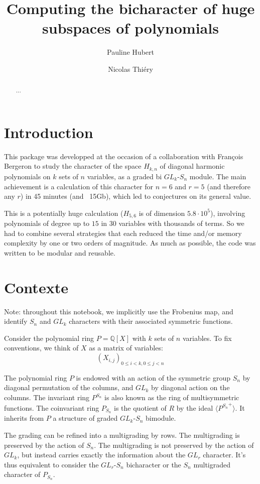 \documentclass[letter,12pt]{article}
\title{Computing the bicharacter of huge subspaces of polynomials}
\author{Pauline Hubert \and Nicolas Thiéry}
\newcommand{\QQ}{\mathbb{Q}}
\begin{document}
	
	\maketitle 
	
	\begin{abstract}
		... 
	\end{abstract}
	
	\tableofcontents

	
	\section{Introduction}
	This package was developped at the occasion of a collaboration with François Bergeron to study the character of the space $H_{k,n}$ of diagonal harmonic polynomials on $k$ sets of $n$ variables, as a graded bi $GL_k$-$S_n$  module. The main achievement is a calculation of this character for $n=6$ and $r=5$ (and therefore any $r$) in 45 minutes (and ~15Gb), which led to conjectures on its general value.
	
	This is a potentially huge calculation ($H_{5,6}$ is of dimension $5.8 \cdot10^5$), involving polynomials of degree up to $15$ in $30$ variables with thousands of terms. So we had to combine several strategies that each reduced the time and/or memory complexity by one or two orders of magnitude. As much as possible, the code was written to be modular and reusable.
	
	\section{Contexte}
	Note: throughout this notebook, we implicitly use the Frobenius map, and identify $S_n$ and $GL_k$ characters with their associated symmetric functions.
	
	Consider the polynomial ring $P=\QQ[X]$ with $k$ sets of $n$ variables. To fix conventions, we think of $X$ as a matrix of variables:
	$$(X_{i,j})_{0\leq i<k, 0\leq j<n}$$
	
	The polynomial ring $P$ is endowed with an action of the symmetric group $S_n$ by diagonal permutation of the columns, and $GL_k$ by diagonal action on the columns. The invariant ring $P^{S_n}$ is also known as the ring of multisymmetric functions. The coinvariant ring $P_{S_n}$ is the quotient of $R$ by the ideal $\langle {P^{S_n}}^+ \rangle$. It inherits from $P$ a structure of graded $GL_k$-$S_n$ bimodule.
	
	The grading can be refined into a multigrading by rows. The multigrading is preserved by the action of $S_n$. The multigrading is not preserved by the action of $GL_k$, but instead carries exactly the information about the $GL_r$ character. It's thus equivalent to consider the $GL_r$-$S_n$ bicharacter or the $S_n$ multigraded character of $P_{S_n}$.
	
\end{document}
